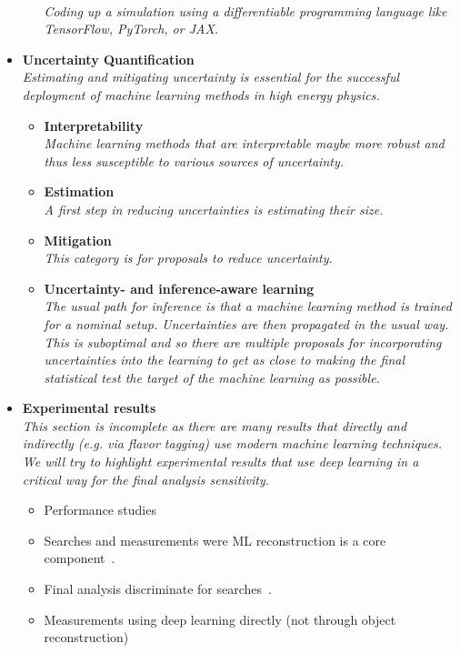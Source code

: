 \documentclass[12pt,letterpaper]{article}
\begin{document}
\begin{itemize}
\begin{itemize}
		\\\textit{Coding up a simulation using a differentiable programming language like TensorFlow, PyTorch, or JAX.}
	\end{itemize}
\item \textbf{Uncertainty Quantification}
\\\textit{Estimating and mitigating uncertainty is essential for the successful deployment of machine learning methods in high energy physics. }
	\begin{itemize}
		\item \textbf{Interpretability}~\cite{deOliveira:2015xxd,Chang:2017kvc,Diefenbacher:2019ezd,Agarwal:2020fpt,Grojean:2020ech,Romero:2021qlf,Collins:2021pld,Mokhtar:2021bkf,Bradshaw:2022qev,Anzalone:2022hrt,Grojean:2022mef,Khot:2022aky}
		\\\textit{Machine learning methods that are interpretable maybe more robust and thus less susceptible to various sources of uncertainty.}
		\item \textbf{Estimation}~\cite{Nachman:2019dol,Nachman:2019yfl,Barnard:2016qma,Bellagente:2021yyh,Cheung:2022dil}
		\\\textit{A first step in reducing uncertainties is estimating their size.}
		\item \textbf{Mitigation}~\cite{Estrade:DLPS2017,Englert:2018cfo,Louppe:2016ylz,Araz:2021wqm,Stein:2022nvf}
		\\\textit{This category is for proposals to reduce uncertainty.}
		\item \textbf{Uncertainty- and inference-aware learning}~\cite{Caron:2019xkx,Bollweg:2019skg,deCastro:2018mgh,Wunsch:2020iuh,Ghosh:2021roe,Abudinen:2021qpc,Simpson:2022suz}
		\\\textit{The usual path for inference is that a machine learning method is trained for a nominal setup.  Uncertainties are then propagated in the usual way.  This is suboptimal and so there  are multiple proposals for incorporating uncertainties into the learning to get as close to making the final statistical test the target of the machine learning as possible.}
	\end{itemize}
\item \textbf{Experimental results}
\\\textit{This section is incomplete as there are many results that directly and indirectly (e.g. via flavor tagging) use modern machine learning techniques.  We will try to highlight experimental results that use deep learning in a critical way for the final analysis sensitivity.}
	\begin{itemize}
		\item Performance studies~\cite{CMS:2022prd}
		\item Searches and measurements were ML reconstruction is a core component~\cite{MicroBooNE:2021nxr,MicroBooNE:2021jwr}.
		\item Final analysis discriminate for searches~\cite{Aad:2019yxi,Aad:2020hzm,collaboration2020dijet,Sirunyan:2020hwz}.
		\item Measurements using deep learning directly (not through object reconstruction)~\cite{H1:2021wkz}
	\end{itemize}



\end{itemize}
\end{document}

